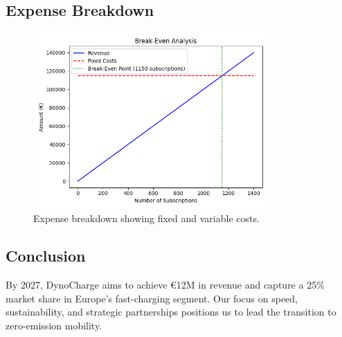 \subsection{Expense Breakdown}
\begin{figure}[h!]
    \centering
    \includegraphics[width=0.8\textwidth]{images/Break Even.png}
    \caption{Expense breakdown showing fixed and variable costs.}
    \label{fig:expense_breakdown}
\end{figure}



\subsection{Conclusion}
By 2027, DynoCharge aims to achieve €12M in revenue and capture a 25\% market share in Europe’s fast-charging segment. Our focus on speed, sustainability, and strategic partnerships positions us to lead the transition to zero-emission mobility.

